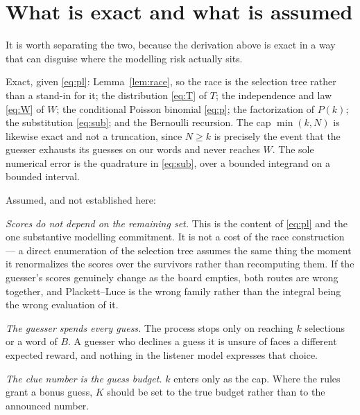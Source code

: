 \documentclass[12pt]{article}
\begin{document}
\section{What is exact and what is assumed}
\label{sec:assumptions}

It is worth separating the two, because the derivation above is exact in a way
that can disguise where the modelling risk actually sits.

Exact, given \eqref{eq:pl}: Lemma~\ref{lem:race}, so the race is the selection
tree rather than a stand-in for it; the distribution \eqref{eq:T} of $T$; the
independence and law \eqref{eq:W} of $W$; the conditional Poisson binomial
\eqref{eq:p}; the factorization of $P(k)$; the substitution \eqref{eq:sub}; and
the Bernoulli recursion. The cap $\min(k, N)$ is likewise exact and not a
truncation, since $N \ge k$ is precisely the event that the guesser exhausts
its guesses on our words and never reaches $W$. The sole numerical error is the
quadrature in \eqref{eq:sub}, over a bounded integrand on a bounded interval.

Assumed, and not established here:

\emph{Scores do not depend on the remaining set.} This is the content of
\eqref{eq:pl} and the one substantive modelling commitment. It is not a cost of
the race construction --- a direct enumeration of the selection tree assumes
the same thing the moment it renormalizes the scores over the survivors rather
than recomputing them. If the guesser's scores genuinely change as the board
empties, both routes are wrong together, and Plackett--Luce is the wrong family
rather than the integral being the wrong evaluation of it.

\emph{The guesser spends every guess.} The process stops only on reaching $k$
selections or a word of $B$. A guesser who declines a guess it is unsure of
faces a different expected reward, and nothing in the listener model expresses
that choice.

\emph{The clue number is the guess budget.} $k$ enters only as the cap. Where
the rules grant a bonus guess, $K$ should be set to the true budget rather
than to the announced number.
\end{document}
